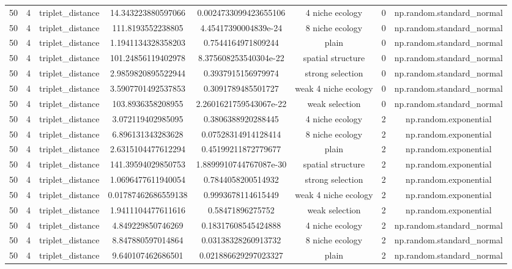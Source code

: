 \begin{table}[h!]
\begin{tabular}{||c c c c c c c c||}
50 & 4 & triplet\_distance & 14.343223880597066 & 0.0024733099423655106 & 4 niche ecology & 0 & np.random.standard\_normal \\ 
50 & 4 & triplet\_distance & 111.8193552238805 & 4.45417390004839e-24 & 8 niche ecology & 0 & np.random.standard\_normal \\ 
50 & 4 & triplet\_distance & 1.1941134328358203 & 0.7544164971809244 & plain & 0 & np.random.standard\_normal \\ 
50 & 4 & triplet\_distance & 101.24856119402978 & 8.375608253540304e-22 & spatial structure & 0 & np.random.standard\_normal \\ 
50 & 4 & triplet\_distance & 2.9859820895522944 & 0.3937915156979974 & strong selection & 0 & np.random.standard\_normal \\ 
50 & 4 & triplet\_distance & 3.5907701492537853 & 0.3091789485501727 & weak 4 niche ecology & 0 & np.random.standard\_normal \\ 
50 & 4 & triplet\_distance & 103.8936358208955 & 2.2601621759543067e-22 & weak selection & 0 & np.random.standard\_normal \\ 
50 & 4 & triplet\_distance & 3.072119402985095 & 0.3806388920288445 & 4 niche ecology & 2 & np.random.exponential \\ 
50 & 4 & triplet\_distance & 6.896131343283628 & 0.07528314914128414 & 8 niche ecology & 2 & np.random.exponential \\ 
50 & 4 & triplet\_distance & 2.6315104477612294 & 0.45199211872779677 & plain & 2 & np.random.exponential \\ 
50 & 4 & triplet\_distance & 141.39594029850753 & 1.8899910744767087e-30 & spatial structure & 2 & np.random.exponential \\ 
50 & 4 & triplet\_distance & 1.0696477611940054 & 0.7844058200514932 & strong selection & 2 & np.random.exponential \\ 
50 & 4 & triplet\_distance & 0.01787462686559138 & 0.9993678114615449 & weak 4 niche ecology & 2 & np.random.exponential \\ 
50 & 4 & triplet\_distance & 1.9411104477611616 & 0.58471896275752 & weak selection & 2 & np.random.exponential \\ 
50 & 4 & triplet\_distance & 4.849229850746269 & 0.18317608545424888 & 4 niche ecology & 2 & np.random.standard\_normal \\ 
50 & 4 & triplet\_distance & 8.847880597014864 & 0.03138328260913732 & 8 niche ecology & 2 & np.random.standard\_normal \\ 
50 & 4 & triplet\_distance & 9.640107462686501 & 0.021886629297023327 & plain & 2 & np.random.standard\_normal \\ 

\end{tabular}
\end{table}
